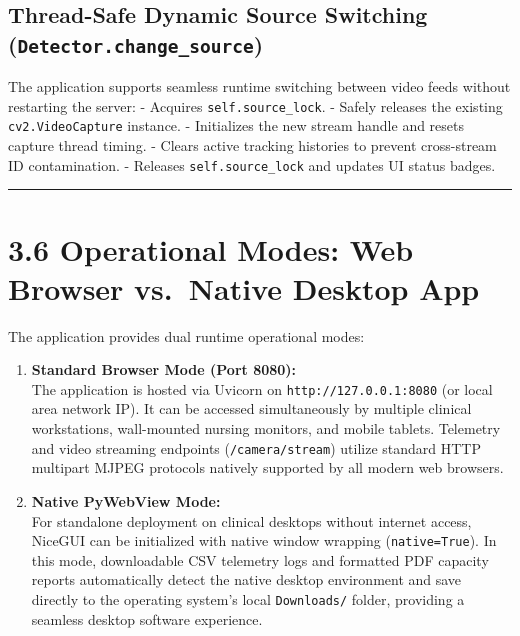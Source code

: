 \subsection{\texorpdfstring{Thread-Safe Dynamic Source Switching
(\texttt{Detector.change\_source})}{Thread-Safe Dynamic Source Switching (Detector.change\_source)}}\label{thread-safe-dynamic-source-switching-detector.change_source}

The application supports seamless runtime switching between video feeds
without restarting the server: - Acquires \texttt{self.source\_lock}. -
Safely releases the existing \texttt{cv2.VideoCapture} instance. -
Initializes the new stream handle and resets capture thread timing. -
Clears active tracking histories to prevent cross-stream ID
contamination. - Releases \texttt{self.source\_lock} and updates UI
status badges.

\begin{center}\rule{0.5\linewidth}{0.5pt}\end{center}

\section{3.6 Operational Modes: Web Browser vs.~Native Desktop
App}\label{operational-modes-web-browser-vs.-native-desktop-app}

The application provides dual runtime operational modes:

\begin{enumerate}
\def\labelenumi{\arabic{enumi}.}
\item
  \textbf{Standard Browser Mode (Port 8080):}\\
  The application is hosted via Uvicorn on
  \texttt{http://127.0.0.1:8080} (or local area network IP). It can be
  accessed simultaneously by multiple clinical workstations,
  wall-mounted nursing monitors, and mobile tablets. Telemetry and video
  streaming endpoints (\texttt{/camera/stream}) utilize standard HTTP
  multipart MJPEG protocols natively supported by all modern web
  browsers.
\item
  \textbf{Native PyWebView Mode:}\\
  For standalone deployment on clinical desktops without internet
  access, NiceGUI can be initialized with native window wrapping
  (\texttt{native=True}). In this mode, downloadable CSV telemetry logs
  and formatted PDF capacity reports automatically detect the native
  desktop environment and save directly to the operating system's local
  \texttt{Downloads/} folder, providing a seamless desktop software
  experience.
\end{enumerate}

